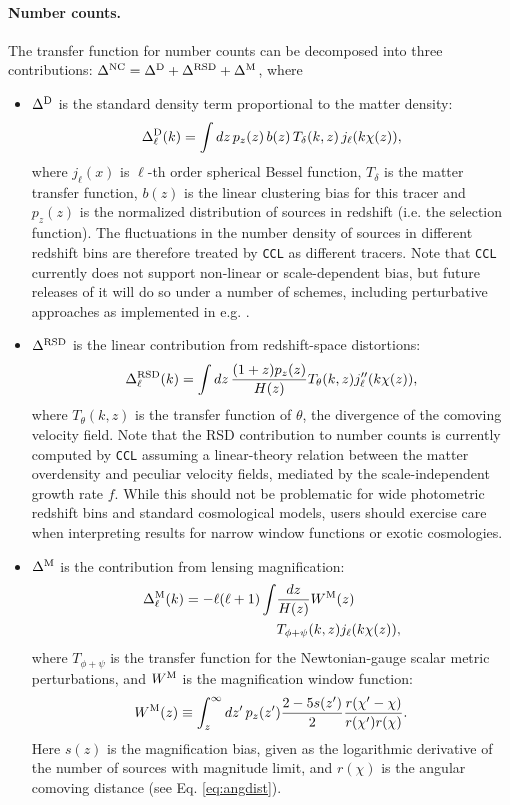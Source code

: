 \documentclass[\docopts]{\docclass}
\newcommand{\ccl}{{\tt CCL}\xspace}
\begin{document}
\paragraph{\bf Number counts.} The transfer function for number counts can be decomposed into three contributions: $\Delta^{\rm NC}=\Delta^{\rm D}+\Delta^{\rm RSD}+\Delta^{\rm M}$, where
\begin{itemize}
  \item $\Delta^{\rm D}$ is the standard density term proportional to the matter density:
        \begin{equation}
          \Delta^{\rm D}_\ell(k)=\int dz\,p_z(z)\,b(z)\,T_\delta(k,z)\,j_\ell(k\chi(z)),
        \end{equation}
        where $j_\ell(x)$ is $\ell$-th order spherical Bessel function, $T_\delta$ is the matter transfer function, $b(z)$ is the linear clustering bias for this tracer and $p_z(z)$ is the normalized distribution of sources in redshift (i.e. the selection function). The fluctuations in the number density of sources in different redshift bins are therefore treated by \ccl as different tracers. Note that \ccl currently does not support non-linear or scale-dependent bias, but future releases of it will do so under a number of schemes, including perturbative approaches as implemented in e.g. \cite{FASTPT}.
  \item $\Delta^{\rm RSD}$ is the linear contribution from redshift-space distortions:
        \begin{equation}
          \Delta^{\rm RSD}_\ell(k)=\int dz\,\frac{(1+z) p_z(z)}{H(z)}T_\theta(k,z) j_\ell''(k\chi(z)),
        \end{equation}
        where $T_\theta(k,z)$ is the transfer function of $\theta$, the divergence of the comoving velocity field. Note that the RSD contribution to number counts is currently computed by \ccl assuming a linear-theory relation between the matter overdensity and peculiar velocity fields, mediated by the scale-independent growth rate $f$. While this should not be problematic for wide photometric redshift bins and standard cosmological models, users should exercise care when interpreting results for narrow window functions or exotic cosmologies.
  \item $\Delta^{\rm M}$ is the contribution from lensing magnification:
        \begin{align}\nonumber
          \Delta_\ell^{\rm M}(k)=-\ell(\ell+1)\int & \frac{dz}{H(z)} W^{\rm M}(z) \\
          &T_{\phi+\psi}(k,z) j_\ell(k\chi(z)),
        \end{align}
        where $T_{\phi+\psi}$ is the transfer function for the Newtonian-gauge scalar metric perturbations, and $W^{\rm M}$ is the magnification window function:
        \begin{equation}
          W^{\rm M}(z)\equiv\int_z^\infty dz'\,p_z(z')\frac{2-5s(z')}{2}\frac{r(\chi'-\chi)}{r(\chi')r(\chi)}.
        \end{equation}
        Here $s(z)$ is the magnification bias, given as the logarithmic derivative of the number of sources with magnitude limit, and $r(\chi)$ is the angular comoving distance (see Eq. \ref{eq:angdist}).
\end{itemize}
\end{document}
